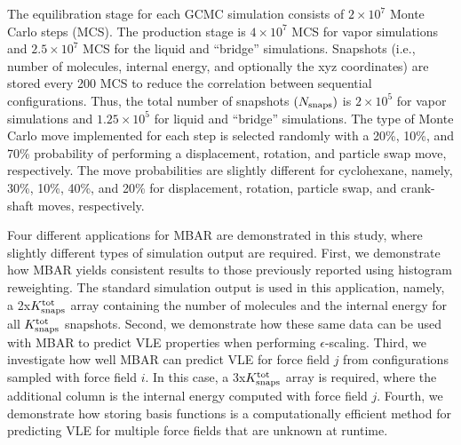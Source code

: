 \documentclass[journal=jced,manuscript=article]{achemso}
\begin{document}
The equilibration stage for each GCMC simulation consists of $2 \times 10^7$ Monte Carlo steps (MCS). The production stage is $4 \times 10^7$ MCS for vapor simulations and $2.5 \times 10^7$ MCS for the liquid and ``bridge'' simulations. Snapshots (i.e., number of molecules, internal energy, and optionally the xyz coordinates) are stored every 200 MCS to reduce the correlation between sequential configurations. Thus, the total number of snapshots $(N_{\rm snaps})$ is $2 \times 10^5$ for vapor simulations and $1.25 \times 10^5$ for liquid and ``bridge'' simulations. The type of Monte Carlo move implemented for each step is selected randomly with a 20\%, 10\%, and 70\% probability of performing a displacement, rotation, and particle swap move, respectively. The move probabilities are slightly different for cyclohexane, namely, 30\%, 10\%, 40\%, and 20\% for displacement, rotation, particle swap, and crank-shaft moves, respectively.  


Four different applications for MBAR are demonstrated in this study, where slightly different types of simulation output are required. First, we demonstrate how MBAR yields consistent results to those previously reported using histogram reweighting. The standard simulation output is used in this application, namely, a 2x$K^{\rm tot}_{\rm snaps}$ array containing the number of molecules and the internal energy for all $K^{\rm tot}_{\rm snaps}$ snapshots. Second, we demonstrate how these same data can be used with MBAR to predict VLE properties when performing $\epsilon$-scaling. Third, we investigate how well MBAR can predict VLE for force field $j$ from configurations sampled with force field $i$. In this case, a 3x$K^{\rm tot}_{\rm snaps}$ array is required, where the additional column is the internal energy computed with force field $j$. Fourth, we demonstrate how storing basis functions is a computationally efficient method for predicting VLE for multiple force fields that are unknown at runtime.   

\end{document}
